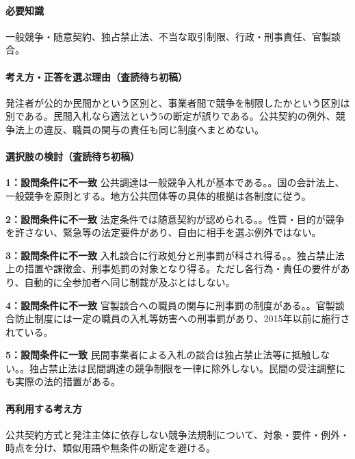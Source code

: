 \paragraph{必要知識} 一般競争・随意契約、独占禁止法、不当な取引制限、行政・刑事責任、官製談合。

\paragraph{考え方・正答を選ぶ理由（査読待ち初稿）} 発注者が公的か民間かという区別と、事業者間で競争を制限したかという区別は別である。民間入札なら適法という5の断定が誤りである。公共契約の例外、競争法上の違反、職員の関与の責任も同じ制度へまとめない。

\paragraph{選択肢の検討（査読待ち初稿）}\mbox{}\par

\noindent\textbf{1：設問条件に不一致} 公共調達は一般競争入札が基本である。。国の会計法上、一般競争を原則とする。地方公共団体等の具体的根拠は各制度に従う。\par

\noindent\textbf{2：設問条件に不一致} 法定条件では随意契約が認められる。。性質・目的が競争を許さない、緊急等の法定要件があり、自由に相手を選ぶ例外ではない。\par

\noindent\textbf{3：設問条件に不一致} 入札談合に行政処分と刑事罰が科され得る。。独占禁止法上の措置や課徴金、刑事処罰の対象となり得る。ただし各行為・責任の要件があり、自動的に全参加者へ同じ制裁が及ぶとはしない。\par

\noindent\textbf{4：設問条件に不一致} 官製談合への職員の関与に刑事罰の制度がある。。官製談合防止制度には一定の職員の入札等妨害への刑事罰があり、2015年以前に施行されている。\par

\noindent\textbf{5：設問条件に一致} 民間事業者による入札の談合は独占禁止法等に抵触しない。。独占禁止法は民間調達の競争制限を一律に除外しない。民間の受注調整にも実際の法的措置がある。\par

\paragraph{再利用する考え方} 公共契約方式と発注主体に依存しない競争法規制について、対象・要件・例外・時点を分け、類似用語や無条件の断定を避ける。

